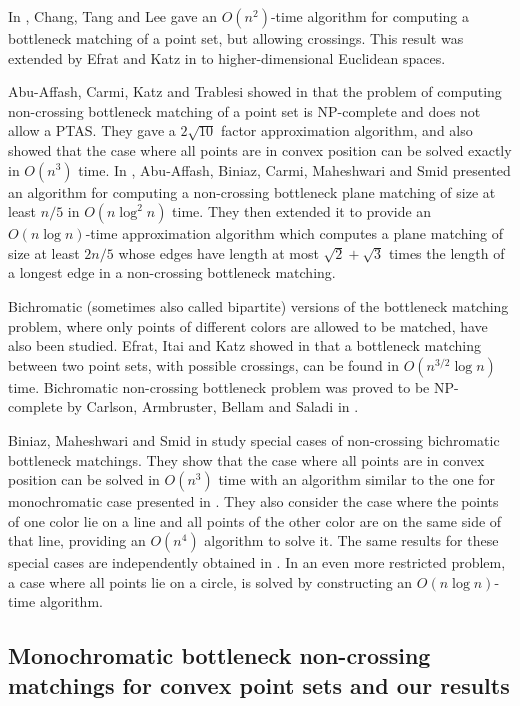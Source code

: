 \documentclass[a4paper, 11pt]{article}
\begin{document}
In \cite{chang1992solving}, Chang, Tang and Lee gave an $O(n^2)$-time algorithm for computing a bottleneck matching of a point set, but allowing crossings. This result was extended by Efrat and Katz in \cite{efrat2000computing} to higher-dimensional Euclidean spaces.

Abu-Affash, Carmi, Katz and Trablesi showed in \cite{abu2014bottleneck} that the problem of computing non-crossing bottleneck matching of a point set is NP-complete and does not allow a PTAS. They gave a $2\sqrt{10}$ factor approximation algorithm, and also showed that the case where all points are in convex position can be solved exactly in $O(n^3)$ time. In \cite{abu2015approximating}, Abu-Affash, Biniaz, Carmi, Maheshwari and Smid presented an algorithm for computing a non-crossing bottleneck plane matching of size at least $n/5$ in $O(n \log^2 n)$ time. They then extended it to provide an $O(n \log n)$-time approximation algorithm which computes a plane matching of size at least $2n/5$ whose edges have length at most $\sqrt{2}+\sqrt{3}$ times the length of a longest edge in a non-crossing bottleneck matching.


Bichromatic (sometimes also called bipartite) versions of the bottleneck matching problem, where only points of different colors are allowed to be matched, have also been studied. Efrat, Itai and Katz showed in \cite{efrat01geometryhelps} that a bottleneck matching between two point sets, with possible crossings, can be found in $O(n^{3/2}\log n)$ time. Bichromatic non-crossing bottleneck problem was proved to be NP-complete by Carlson, Armbruster, Bellam and Saladi in \cite{carlsson2015bottleneck}.

Biniaz, Maheshwari and Smid in \cite{biniaz2014bottleneck} study special cases of non-crossing bichromatic bottleneck matchings. They show that the case where all points are in convex position can be solved in $O(n^3)$ time with an algorithm similar to the one for monochromatic case presented in \cite{abu2014bottleneck}. They also consider the case where the points of one color lie on a line and all points of the other color are on the same side of that line, providing an $O(n^4)$ algorithm to solve it. The same results for these special cases are independently obtained in \cite{carlsson2015bottleneck}. In \cite{biniaz2014bottleneck} an even more restricted problem, a case where all points lie on a circle, is solved by constructing an $O(n \log n)$-time algorithm.



\subsection{Monochromatic bottleneck non-crossing matchings for convex point sets and our results}
\end{document}
